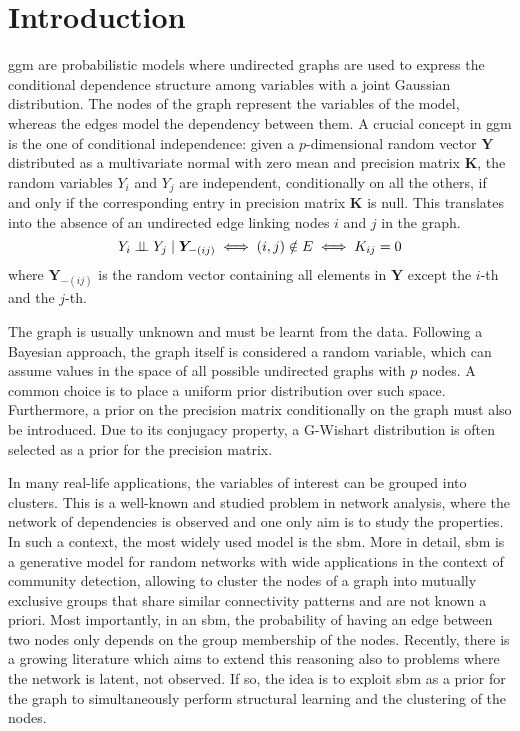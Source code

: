 
\section{Introduction}
\gls{ggm} are probabilistic models where undirected graphs are used to express the conditional dependence structure among variables with a joint Gaussian distribution. The nodes of the graph represent the variables of the model, whereas the edges model the dependency between them. A crucial concept in \gls{ggm} is the one of conditional independence: given a $p$-dimensional random vector $\bm{Y}$ distributed as a multivariate normal with zero mean and precision matrix $\bm{K}$, the random variables $Y_i$ and $Y_j$ are independent, conditionally on all the others, if and only if the corresponding entry in precision matrix $\bm{K}$ is null. This translates into the absence of an undirected edge linking nodes $i$ and $j$ in the graph. 
\[
    Y_i \perp \!\!\! \perp Y_j \mid \bm{Y}_{-(i j)} \iff(i, j) \notin E \iff K_{i j}=0
\]
where $\bm{Y}_{-(i j)}$ is the random vector containing all elements in $\bm{Y}$ except the $i$-th and the $j$-th.

The graph is usually unknown and must be learnt from the data. Following a Bayesian approach, the graph itself is considered a random variable, which can assume values in the space of all possible undirected graphs with $p$ nodes. A common choice is to place a uniform prior distribution over such space. Furthermore, a prior on the precision matrix conditionally on the graph must also be introduced. Due to its conjugacy property, a G-Wishart distribution is often selected as a prior for the precision matrix.

In many real-life applications, the variables of interest can be grouped into clusters. This is a well-known and studied problem in network analysis, where the network of dependencies is observed and one only aim is to study the properties. In such a context, the most widely used model is the \gls{sbm}. More in detail, \gls{sbm} is a generative model for random networks with wide applications in the context of community detection, allowing to cluster the nodes of a graph into mutually exclusive groups that share similar connectivity patterns and are not known a priori. Most importantly, in an \gls{sbm}, the probability of having an edge between two nodes only depends on the group membership of the nodes. Recently, there is a growing literature which aims to extend this reasoning also to problems where the network is latent, not observed. If so, the idea is to exploit \gls{sbm} as a prior for the graph to simultaneously perform structural learning and the clustering of the nodes.

